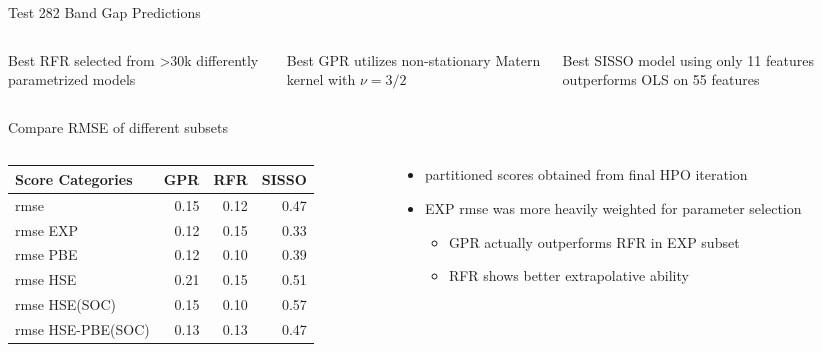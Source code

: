 \documentclass[10pt, aspectratio=169, presentation]{beamer}
\begin{document}
\begin{frame}[label={sec:orgd1a201b}]{Test 282 Band Gap Predictions}
 
\begin{center}

\end{center}

\begin{columns}
\begin{column}{0.3\columnwidth}
Best RFR selected from >30k differently parametrized models
\end{column}

\begin{column}{0.3\columnwidth}
Best GPR utilizes non-stationary Matern kernel with \(\nu=3\slash{}2\)
\end{column}

\begin{column}{0.3\columnwidth}
Best SISSO model using only 11 features outperforms OLS on 55 features
\end{column}
\end{columns}
\end{frame}

\begin{frame}[label={sec:orgbc738aa}]{Compare RMSE of different subsets}
\begin{columns}
\begin{column}{0.5\columnwidth}
\begin{center}
\begin{tabular}{lrrr}
Score Categories & GPR & RFR & SISSO\\[0pt]
\hline
rmse & 0.15 & 0.12 & 0.47\\[0pt]
rmse EXP & 0.12 & 0.15 & 0.33\\[0pt]
rmse PBE & 0.12 & 0.10 & 0.39\\[0pt]
rmse HSE & 0.21 & 0.15 & 0.51\\[0pt]
rmse HSE(SOC) & 0.15 & 0.10 & 0.57\\[0pt]
rmse HSE-PBE(SOC) & 0.13 & 0.13 & 0.47\\[0pt]
\end{tabular}
\end{center}
\end{column}

\begin{column}{0.5\columnwidth}
\begin{itemize}
\item partitioned scores obtained from final HPO iteration
\item EXP rmse was more heavily weighted for parameter selection
\begin{itemize}
\item GPR actually outperforms RFR in EXP subset
\item RFR shows better extrapolative ability
\end{itemize}
\end{itemize}
\end{column}
\end{columns}
\end{frame}
\end{document}
